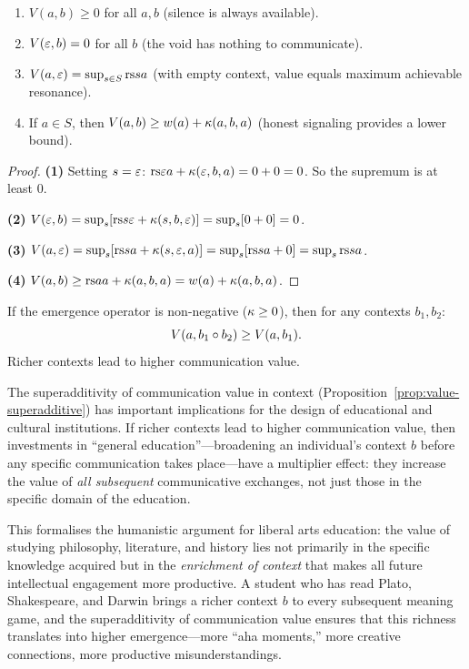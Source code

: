 \begin{theorem}
\label{thm:value-properties}
\begin{enumerate}
\item $V(a, b) \geq 0$ for all $a, b$ (silence is always available).
\item $V(\varepsilon, b) = 0$ for all $b$ (the void has nothing to communicate).
\item $V(a, \varepsilon) = \sup_{s \in S} \mathrm{rs}{s}{a}$ (with empty context,
  value equals maximum achievable resonance).
\item If $a \in S$, then $V(a, b) \geq w(a) + \kappa(a, b, a)$
  (honest signaling provides a lower bound).
\end{enumerate}
\end{theorem}

\begin{proof}
\textbf{(1)} Setting $s = \varepsilon$: $\mathrm{rs}{\varepsilon}{a} + \kappa(\varepsilon, b, a) = 0 + 0 = 0$.
So the supremum is at least 0.

\textbf{(2)} $V(\varepsilon, b) = \sup_s [\mathrm{rs}{s}{\varepsilon} + \kappa(s, b, \varepsilon)] = \sup_s [0 + 0] = 0$.

\textbf{(3)} $V(a, \varepsilon) = \sup_s [\mathrm{rs}{s}{a} + \kappa(s, \varepsilon, a)]
= \sup_s [\mathrm{rs}{s}{a} + 0] = \sup_s \mathrm{rs}{s}{a}$.

\textbf{(4)} $V(a, b) \geq \mathrm{rs}{a}{a} + \kappa(a, b, a) = w(a) + \kappa(a, b, a)$.
\end{proof}

\begin{proposition}
\label{prop:value-superadditive}
If the emergence operator is non-negative ($\kappa \geq 0$), then
for any contexts $b_1, b_2$:
\[
  V(a, b_1 \circ b_2) \geq V(a, b_1).
\]
Richer contexts lead to higher communication value.
\end{proposition}

\begin{interpretation}
\label{interp:ch14:value_superadditive_education}
The superadditivity of communication value in context
(Proposition~\ref{prop:value-superadditive}) has important implications
for the design of educational and cultural institutions.  If richer contexts
lead to higher communication value, then investments in ``general
education''---broadening an individual's context $b$ before any specific
communication takes place---have a multiplier effect: they increase the
value of \emph{all subsequent} communicative exchanges, not just those in
the specific domain of the education.

This formalises the humanistic argument for liberal arts education: the
value of studying philosophy, literature, and history lies not primarily in
the specific knowledge acquired but in the \emph{enrichment of context} that
makes all future intellectual engagement more productive.  A student who has
read Plato, Shakespeare, and Darwin brings a richer context $b$ to every
subsequent meaning game, and the superadditivity of communication value
ensures that this richness translates into higher emergence---more
``aha moments,'' more creative connections, more productive misunderstandings.
\end{interpretation}



